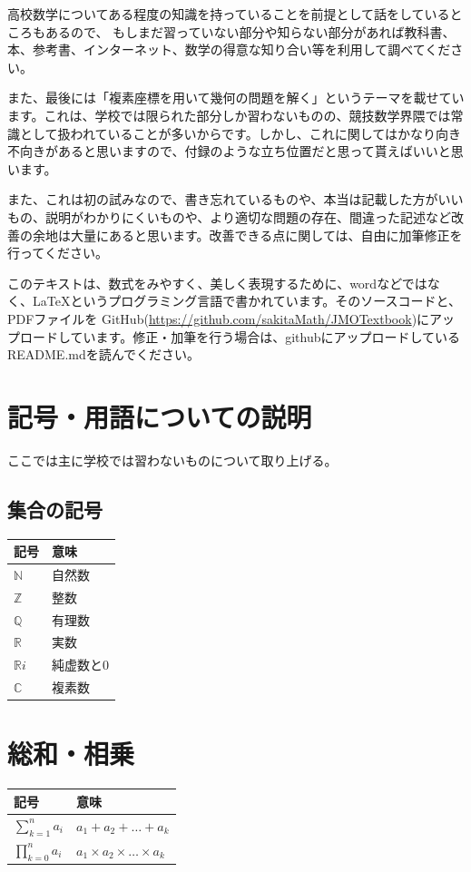 \documentclass[uplatex,dvipdfmx]{jsbook}
\begin{document}
高校数学についてある程度の知識を持っていることを前提として話をしているところもあるので、
もしまだ習っていない部分や知らない部分があれば教科書、本、参考書、インターネット、数学の得意な知り合い等を利用して調べてください。

また、最後には「複素座標を用いて幾何の問題を解く」というテーマを載せています。これは、学校では限られた部分しか習わないものの、競技数学界隈では常識として扱われていることが多いからです。しかし、これに関してはかなり向き不向きがあると思いますので、付録のような立ち位置だと思って貰えばいいと思います。

また、これは初の試みなので、書き忘れているものや、本当は記載した方がいいもの、説明がわかりにくいものや、より適切な問題の存在、間違った記述など改善の余地は大量にあると思います。改善できる点に関しては、自由に加筆修正を行ってください。

このテキストは、数式をみやすく、美しく表現するために、wordなどではなく、\LaTeX というプログラミング言語で書かれています。そのソースコードと、PDFファイルを
GitHub(\url{https://github.com/sakitaMath/JMOTextbook})にアップロードしています。修正・加筆を行う場合は、githubにアップロードしているREADME.mdを読んでください。

\section{記号・用語についての説明}
ここでは主に学校では習わないものについて取り上げる。
\subsection{集合の記号}
\begin{table}[h]
    \begin{tabular}{l|l}
        記号 & 意味\\\hline\hline
        $\mathbb{N}$ & 自然数\\
        $\mathbb{Z}$ & 整数\\
        $\mathbb{Q}$ & 有理数\\
        $\mathbb{R}$ & 実数\\
        $\mathbb{R}i$ & 純虚数と$0$\\
        $\mathbb{C}$ & 複素数\\\hline
    \end{tabular}
\end{table}

\section{総和・相乗}
\begin{table}[h]
    \begin{tabular}{l|l}
        記号 & 意味\\\hline\hline
        $\displaystyle \sum_{k=1}^n a_i$ & $a_1+a_2+\dots +a_k$\\
        $\displaystyle \prod_{k=0}^n a_i$ & $a_1\times a_2\times\dots \times a_k$\\\hline
    \end{tabular}
\end{table}
\end{document}

